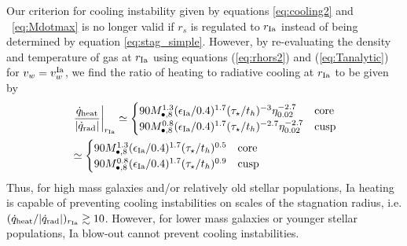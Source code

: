 \documentclass[usenatbib,fleqn]{mn2e}
\newcommand{\rs}{r_s}
\newcommand{\Mbheight}{M_{\bullet,8}}
\newcommand{\rIa}{r_{\rm Ia}}
\renewcommand{\th}{t_h}
\begin{document}
Our criterion for cooling instability given by equations \eqref{eq:cooling2} and ~\eqref{eq:Mdotmax} is no longer valid if $\rs$ is regulated to $\rIa$ instead of being determined by equation \eqref{eq:stag_simple}.  However, by re-evaluating the density and temperature of gas at $\rIa$ using equations  (\ref{eq:rhors2}) and (\ref{eq:Tanalytic}) for $v_w = v_{w}^{\rm Ia}$, we find the ratio of heating to radiative cooling at $\rIa$ to be given by
\begin{align}
\label{eq:heatingratioIa}
&\left.\frac{\dot{q}_{\rm heat}}{\left|\dot{q}_{\rm rad}\right|}\right|_{\rIa}\simeq
\begin{cases}
  90 \Mbheight^{1.3} (\epsilon_{\rm Ia}/0.4)^{1.7} (\tau_{\star}/\th)^{-3}
  \eta_{0.02}^{-2.7} & \text{core}\nonumber\\
   90 \Mbheight^{0.8} (\epsilon_{\rm Ia}/0.4)^{1.7} (\tau_{\star}/\th)^{-2.7}
  \eta_{0.02}^{-2.7} & \text{cusp}\nonumber\\
\end{cases}\\&\simeq
\begin{cases}
  90 \Mbheight^{1.3} (\epsilon_{\rm Ia}/0.4)^{1.7}
  (\tau_{\star}/\th)^{0.5}
 & \text{core}\\
   90 \Mbheight^{0.8} (\epsilon_{\rm Ia}/0.4)^{1.7} (\tau_{\star}/\th)^{0.9}
  & \text{cusp}\\
\end{cases}
\end{align}
Thus, for high mass galaxies and/or relatively old stellar populations, Ia heating is capable of preventing cooling instabilities on scales of the stagnation radius, i.e. $(\dot{q}_{\rm heat}/|\dot{q}_{\rm rad}|)_{\rIa} \gtrsim 10$. However, for lower mass galaxies or younger stellar populations, Ia blow-out cannot prevent cooling instabilities.


\end{document}
